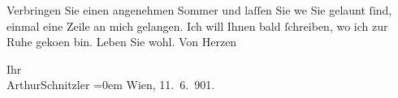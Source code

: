 \pstart
           Verbringen Sie einen angenehmen Sommer und laſſen Sie we{\geminationn}{ }Sie gelaunt{ }ſind, einmal eine Zeile an mich
               gelangen. Ich will Ihnen bald{ }ſchreiben, wo ich zur Ruhe geko{\geminationm}en {\pb}bin. Leben Sie
               wohl. Von Herzen\pend
           
\pstart
           Ihr{\\[\baselineskip]}\spacefill\mbox{ArthurSchnitzler}\pend
           \leftskip=0em{}
\pstart
           Wien, 11. 6. 901.\pend
           \endnumbering{}  \newcommand{\dateiname}{L01127}\newcommand{\titel}{Arthur Schnitzler an Georg Brandes, 11. 6. 1901}\newcommand{\editorInnen}{Martin Anton Müller und Gerd-Hermann Susen}
